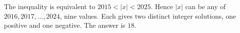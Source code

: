 The inequality is equivalent to $2015<|x|<2025$. Hence $|x|$ can be any of $2016,2017,\ldots,2024$, nine values. Each gives two distinct integer solutions, one positive and one negative. The answer is $\boxed{18}$.
